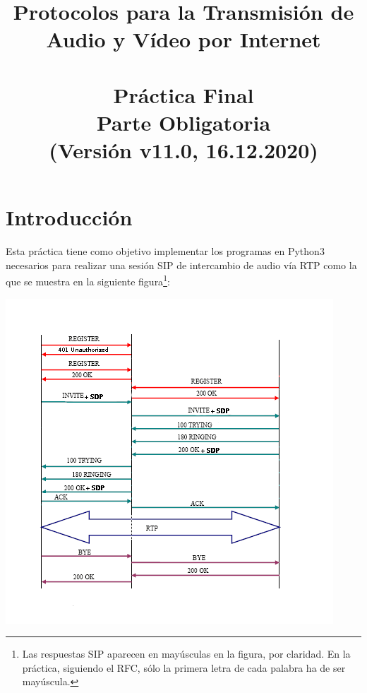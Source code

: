 \documentclass[a4paper,11pt]{article}
\begin{document}
\title{Protocolos para la Transmisión de Audio y Vídeo por Internet\\ 
\ \\ 
Práctica Final \\
Parte Obligatoria \\
(Versión v11.0, 16.12.2020) %
}

\maketitle
\thispagestyle{empty}
\tableofcontents
\newpage


\section{Introducción}

Esta práctica tiene como objetivo implementar los programas en Python3 
necesarios para realizar una sesión SIP de intercambio de audio vía RTP
como la que se muestra en la siguiente figura\footnote{Las respuestas SIP
aparecen en mayúsculas en la figura, por claridad. En la práctica, siguiendo
el RFC, sólo la primera letra de cada palabra ha de ser mayúscula.}:

\begin{center}
\includegraphics{figs/complete-sip-session-auth.png}
\end{center}
\end{document}
